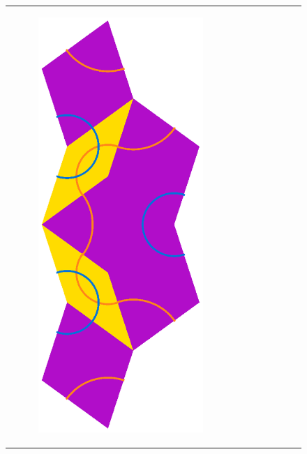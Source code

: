 \documentclass[]{article}
\begin{document}
\begin{figure}[H]
\begin{tabular}{cc}
\begin{subfigure}[b]{0.4\textwidth}
             \includegraphics[scale=0.4]{SkinnyInflation2}
             \end{subfigure}   &
             \begin{subfigure}[b]{0.4\textwidth}

\end{subfigure}
\end{tabular}
\end{figure}
\end{document}
